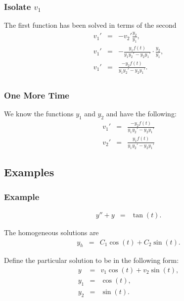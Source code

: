 \begin{frame}
  \frametitle{Isolate $v_1$}

  The first function has been solved in terms of the second
  \begin{eqnarray*}
    v_1' & = & -v_2' \frac{y_2}{y_1}, \\
    v_1' & = & - \frac{y_1 f(t)}{y_1 y_2'-y_2 y_1'} \cdot \frac{y_2}{y_1}, \\
    v_1' & = & \frac{ -y_2 f(t)}{y_1 y_2'-y_2 y_1'}. \\
  \end{eqnarray*}
  


\end{frame}


\begin{frame}
  \frametitle{One More Time}

  We know the functions $y_1$ and $y_2$ and have the following:
  \begin{eqnarray*}
    v_1' & = & \frac{ -y_2 f(t)}{y_1 y_2'-y_2 y_1'} \\
    v_2' & = & \frac{y_1 f(t)}{y_1 y_2'-y_2 y_1'}
  \end{eqnarray*}

\end{frame}

\subsection{Examples}

\begin{frame}
  \frametitle{Example}

  \begin{eqnarray*}
    y'' + y & = & \tan(t).
  \end{eqnarray*}

  {
    The homogeneous solutions are 
    \begin{eqnarray*}
      y_h & = & C_1 \cos(t) + C_2 \sin(t).
    \end{eqnarray*}
  }

  {
    Define the particular solution to be in the following form:
    \begin{eqnarray*}
      y & = & v_1 \cos(t) + v_2 \sin(t), \\
      y_1 & = & \cos(t), \\
      y_2 & = & \sin(t).
    \end{eqnarray*}
  }

\end{frame}


